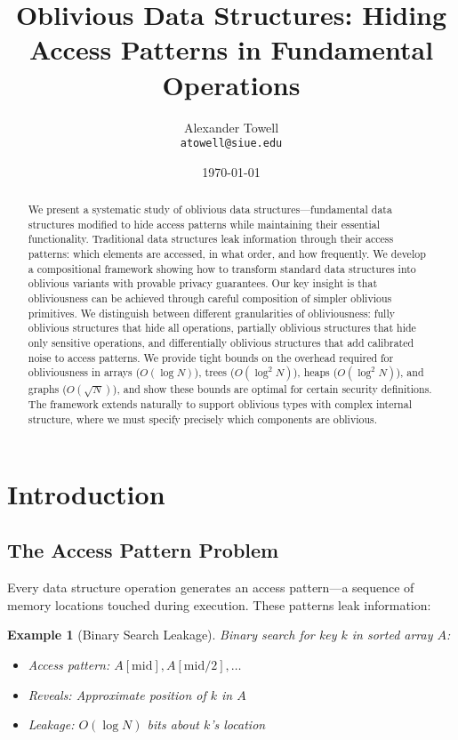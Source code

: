 \documentclass[11pt,final]{article}
\title{Oblivious Data Structures: Hiding Access Patterns in Fundamental Operations}
\author{
    Alexander Towell\\
    \texttt{atowell@siue.edu}
}
\date{\today}
\newtheorem{example}[theorem]{Example}
\begin{document}
\maketitle

\begin{abstract}
We present a systematic study of oblivious data structures—fundamental data structures modified to hide access patterns while maintaining their essential functionality. Traditional data structures leak information through their access patterns: which elements are accessed, in what order, and how frequently. We develop a compositional framework showing how to transform standard data structures into oblivious variants with provable privacy guarantees. Our key insight is that obliviousness can be achieved through careful composition of simpler oblivious primitives. We distinguish between different granularities of obliviousness: fully oblivious structures that hide all operations, partially oblivious structures that hide only sensitive operations, and differentially oblivious structures that add calibrated noise to access patterns. We provide tight bounds on the overhead required for obliviousness in arrays ($O(\log N)$), trees ($O(\log^2 N)$), heaps ($O(\log^2 N)$), and graphs ($O(\sqrt{N})$), and show these bounds are optimal for certain security definitions. The framework extends naturally to support oblivious types with complex internal structure, where we must specify precisely which components are oblivious.
\end{abstract}


\ObliviousNotationGuide

\section{Introduction}

\subsection{The Access Pattern Problem}

Every data structure operation generates an access pattern—a sequence of memory locations touched during execution. These patterns leak information:

\begin{example}[Binary Search Leakage]
Binary search for key $k$ in sorted array $A$:
\begin{itemize}
    \item Access pattern: $A[\text{mid}], A[\text{mid}/2], \ldots$
    \item Reveals: Approximate position of $k$ in $A$
    \item Leakage: $O(\log N)$ bits about $k$'s location
\end{itemize}
\end{example}
\end{document}
